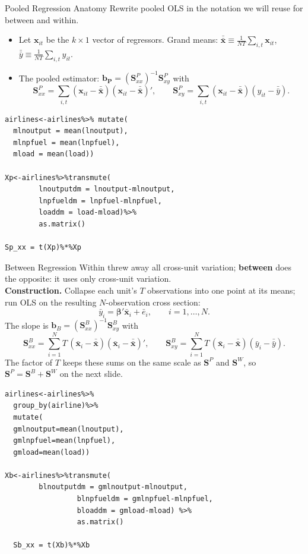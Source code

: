 \documentclass[aspectratio=169, handout]{beamer}
\numberwithin{equation}{section}
\begin{document}
\begin{frame}{Pooled Regression Anatomy}
\small Rewrite pooled OLS in the notation we will reuse for between and within.\\[2pt]
\begin{itemize}
\item Let $\bm{x}_{it}$ be the $k\times 1$ vector of regressors. Grand means: $\bm{\bar{\bar{x}}}\equiv \frac{1}{NT}\sum_{i,t} \bm{x}_{it}$, $\bar{\bar{y}}\equiv \frac{1}{NT}\sum_{i,t} y_{it}$.\pause
\item The pooled estimator: $\bm{b_P}=(\bm{S}^P_{xx})^{-1}\bm{S}_{xy}^P$ with
$$\bm{S}^P_{xx}= \sum_{i,t}(\bm{x}_{it}-\bar{\bar{\bm{x}}})(\bm{x}_{it}-\bar{\bar{\bm{x}}})',\qquad \bm{S}^P_{xy}= \sum_{i,t}(\bm{x}_{it}-\bar{\bar{\bm{x}}})(y_{it}-\bar{\bar{y}}).$$
\end{itemize}
\end{frame}

\begin{frame}[fragile]
  \begin{lstlisting}
airlines<-airlines%>% mutate(
  mlnoutput = mean(lnoutput),
  mlnpfuel = mean(lnpfuel),
  mload = mean(load))
    
Xp<-airlines%>%transmute(
		lnoutputdm = lnoutput-mlnoutput, 
		lnpfueldm = lnpfuel-mlnpfuel,
		loaddm = load-mload)%>%
		as.matrix()

Sp_xx = t(Xp)%*%Xp
  \end{lstlisting}
\end{frame}



\begin{frame}{Between Regression}
Within threw away all cross-unit variation; \textbf{between} does the opposite: it uses only cross-unit variation.\\[4pt]
\textbf{Construction.} Collapse each unit's $T$ observations into one point at its means; run OLS on the resulting $N$-observation cross section:
$$\bar{y}_i=\bm{\beta}'\bar{\bm{x}}_i+\bar{e}_i, \qquad i=1,\ldots,N.$$
The slope is $\bm{b}_B=(\bm{S}^B_{xx})^{-1}\bm{S}^B_{xy}$ with
$$\bm{S}^B_{xx} = \sum_{i=1}^N T\,(\bar{\bm{x}}_i-\bar{\bar{\bm{x}}})(\bar{\bm{x}}_i-\bar{\bar{\bm{x}}})',\qquad \bm{S}^B_{xy} = \sum_{i=1}^N T\,(\bar{\bm{x}}_i-\bar{\bar{\bm{x}}})(\bar{y}_i-\bar{\bar{y}}).$$
The factor of $T$ keeps these sums on the same scale as $\bm{S}^P$ and $\bm{S}^W$, so $\bm{S}^P=\bm{S}^B+\bm{S}^W$ on the next slide.
\end{frame}

\begin{frame}[fragile]
  \begin{lstlisting}
airlines<-airlines%>%
  group_by(airline)%>%
  mutate(
  gmlnoutput=mean(lnoutput),
  gmlnpfuel=mean(lnpfuel),
  gmload=mean(load))
  
Xb<-airlines%>%transmute(
		blnoutputdm = gmlnoutput-mlnoutput, 
                 blnpfueldm = gmlnpfuel-mlnpfuel,
                 bloaddm = gmload-mload) %>%
                 as.matrix()
                     
  Sb_xx = t(Xb)%*%Xb
  \end{lstlisting}
\end{frame}
\end{document}
